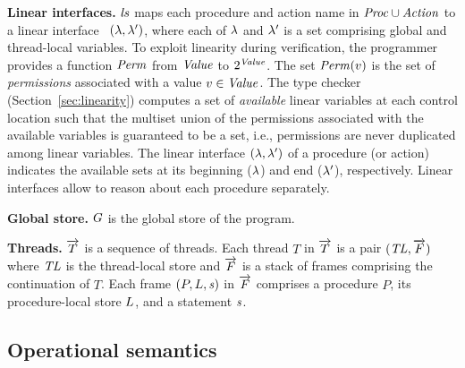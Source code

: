 \noindent
{\bf Linear interfaces.}
$\mathit{ls}$ maps each procedure and action name in $\mathit{Proc} \cup \mathit{Action}$ to a linear interface~\cite{Wadler90lineartypes}
$(\lambda,\lambda')$, where each of $\lambda$ and $\lambda'$ is a set comprising global and thread-local variables.
To exploit linearity during verification, the programmer provides a function $\mathit{Perm}$ from $\mathit{Value}$ to $2^{\mathit{Value}}$.
The set $\mathit{Perm}(v)$ is the set of {\em permissions\/} associated with a value $v \in \mathit{Value}$.
The \civl type checker (Section~\ref{sec:linearity}) computes a set of {\em available\/} linear variables at each control location such that
the multiset union of the permissions associated with the available variables is guaranteed to be a set, i.e., 
permissions are never duplicated among linear variables.
The linear interface $(\lambda, \lambda')$ of a procedure (or action) indicates the available sets
at its beginning ($\lambda$) and end ($\lambda'$), respectively.
Linear interfaces allow \civl to reason about each procedure separately.

\noindent
{\bf Global store.}
$G$ is the global store of the program.

\noindent
{\bf Threads.}
$\overrightarrow{T}$ is a sequence of threads.
Each thread $T$ in $\overrightarrow{T}$ is a pair $(\mathit{TL}, \overrightarrow{F})$ where
$\mathit{TL}$ is the thread-local store and $\overrightarrow{F}$ is a stack of frames comprising the continuation of $T$.  
Each frame $(P, L, \mathit{s})$ in $\overrightarrow{F}$ comprises a procedure $P$, its procedure-local store $L$, 
and a statement $\mathit{s}$.

\subsection{Operational semantics}
\label{sec:operational-semantics}


